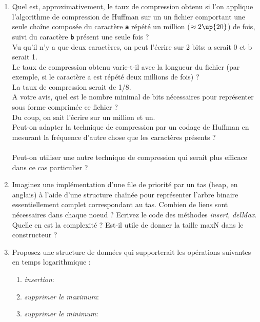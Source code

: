\documentclass[11pt]{article}
\begin{document}
\begin{enumerate}
\item Quel est, approximativement, le taux de compression obtenu si l'on applique l'algorithme de compression de Huffman sur un un fichier comportant une seule chaîne composée du caractère \textbf{\texttt{a}} répété un million ($\approx 2\up{20}$) de fois, suivi du caractère \textbf{\texttt{b}} présent une seule fois ?\\
{\color{dkgreen} Vu qu'il n'y a que deux caractères, on peut l'écrire sur 2 bits: a serait 0 et b serait 1.}\\
Le taux de compression obtenu varie-t-il avec la longueur du fichier (par exemple, si le caractère a est répété deux millions de fois) ?\\
{\color{dkgreen} La taux de compression serait de 1/8.}\\
A votre avis, quel est le nombre minimal de bits nécessaires pour représenter sous forme comprimée ce fichier ? \\
{\color{dkgreen} Du coup, on sait l'écrire sur un million et un.  }\\
Peut-on adapter la technique de compression par un codage de Huffman en mesurant la fréquence d'autre chose que les caractères présents ? \\
{\color{dkgreen}   }\\
Peut-on utiliser une autre technique de compression qui serait plus efficace dans ce cas particulier ? \\
{\color{dkgreen}  }


\item Imaginez une implémentation d'une file de priorité par un tas (heap, en anglais) à l'aide d'une structure chaînée pour représenter l'arbre binaire essentiellement complet correspondant au tas. Combien de liens sont nécessaires dans chaque noeud ? Ecrivez le code des méthodes \textit{insert}, \textit{delMax}. Quelle en est la complexité ? Est-il utile de donner la taille maxN dans le constructeur ? \\
{\color{dkgreen}   }

\item Proposez une structure de données qui supporterait les opérations suivantes en temps logarithmique :\begin{enumerate}
\item \textit{insertion}:
{\color{dkgreen}   }

\item \textit{supprimer le maximum}:
{\color{dkgreen}   }

\item \textit{supprimer le minimum}:
{\color{dkgreen}   }


\end{enumerate}
\end{enumerate}
\end{document}
